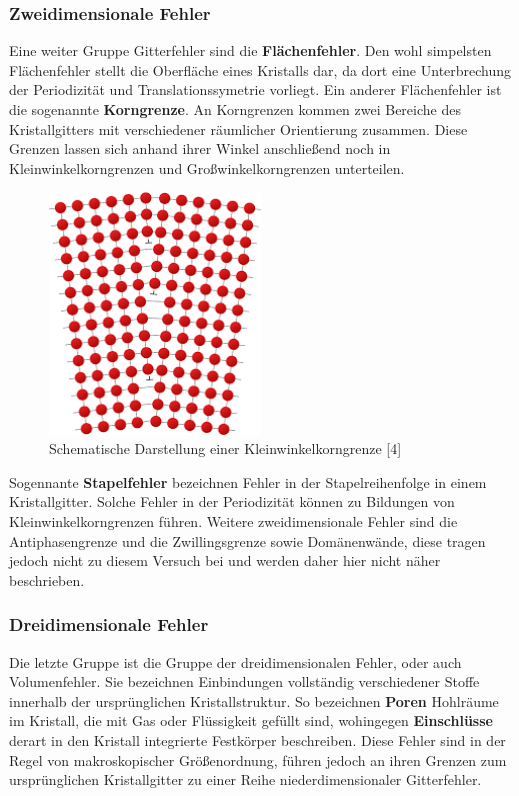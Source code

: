         \subsubsection*{Zweidimensionale Fehler}
            Eine weiter Gruppe Gitterfehler sind die \textbf{Flächenfehler}. Den wohl simpelsten Flächenfehler
            stellt die Oberfläche eines Kristalls dar, da dort eine Unterbrechung der Periodizität und Translationssymetrie vorliegt.
            Ein anderer Flächenfehler ist die sogenannte \textbf{Korngrenze}. An Korngrenzen kommen zwei 
            Bereiche des Kristallgitters mit verschiedener räumlicher Orientierung zusammen. Diese Grenzen lassen sich anhand ihrer Winkel
            anschließend noch in Kleinwinkelkorngrenzen und Großwinkelkorngrenzen unterteilen.
            \begin{figure}[H]
                \centering
                \includegraphics[width=0.5\textwidth]{Images/Kleinwinkelkorngrenze.png}
                \caption{Schematische Darstellung einer Kleinwinkelkorngrenze [4]}
            \end{figure}
            Sogennante \textbf{Stapelfehler} bezeichnen Fehler in der Stapelreihenfolge in einem Kristallgitter. Solche Fehler in der Periodizität
            können zu Bildungen von Kleinwinkelkorngrenzen führen.
            Weitere zweidimensionale Fehler sind die Antiphasengrenze und die Zwillingsgrenze sowie Domänenwände, diese tragen jedoch nicht
            zu diesem Versuch bei und werden daher hier nicht näher beschrieben.
        \subsubsection*{Dreidimensionale Fehler}
            Die letzte Gruppe ist die Gruppe der dreidimensionalen Fehler, oder auch Volumenfehler. Sie bezeichnen Einbindungen vollständig verschiedener Stoffe innerhalb der ursprünglichen
            Kristallstruktur. So bezeichnen \textbf{Poren} Hohlräume im Kristall, die mit Gas oder Flüssigkeit gefüllt sind, wohingegen
            \textbf{Einschlüsse} derart in den Kristall integrierte Festkörper beschreiben.
            Diese Fehler sind in der Regel von makroskopischer Größenordnung, führen jedoch an ihren Grenzen zum ursprünglichen Kristallgitter
            zu einer Reihe niederdimensionaler Gitterfehler.

